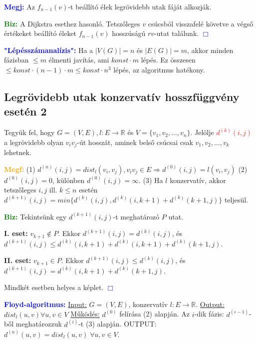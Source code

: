 \documentclass[../szamtud.tex]{subfiles}
\begin{document}
        \textcolor{blue}{\textbf{Megj:}} Az $f_{n-1}(v)$-t beállító élek legrövidebb utak fáját alkozják. 

        \textcolor{green}{\textbf{Biz:}} A Dijkstra esethez hasonló. Tetszőleges $v$ csúcsból visszafelé követve a végső értékeket beállító éleket $f_{n-1}(v)$ hosszúságú $rv$-utat találunk.  \textcolor{blue}{$\Box$} 

        \textcolor{blue}{\textbf{"Lépésszámanalízis":}} Ha a $|V(G)| = n$ és $|E(G)| = m$, akkor minden fázisban $\leq m$ élmenti javítás, ami $konst \cdot m$ lépés. Ez összesen $\leq konst \cdot (n-1) \cdot m \leq konst \cdot n^3$ lépés, az algoritmus hatékony.

    \subsection{Legrövidebb utak konzervatív hosszfüggvény esetén 2}

        Tegyük fel, hogy $G = (V,E), l:E \rightarrow \mathbb{R}$ és $V = \{v_1, v_2, \dots,v_n\}$. Jelölje \textcolor{red}{$d^{(k)}(i,j)$} a legrövidebb olyan $v_iv_j$-út hosszát, aminek belső csúcsai csak $v_1,v_2,\dots,v_k$ lehetnek.

        \textcolor{orange}{\textbf{Megf:}} (1) $d^{(n)}(i,j) = dist_l(v_i,v_j), v_iv_j \in E \Rightarrow d^{(0)}(i,j) = l(v_i,v_j)$ (2) $d^{(0)}(i,j) = 0$, különben $d^{(0)}(i,j) = \infty$. (3) Ha $l$ konzervatív, akkor tetszőleges $i,j$ ill. $k \leq n$ esetén $d^{(k+1)}(i,j) = min \{d^{(k)}(i,j), d^{(k)}(i,k+1)+d^{(k)}(k+1,j)\}$ teljesül.

        \textcolor{green}{\textbf{Biz:}} Tekintsünk egy $d^{(k+1)}(i,j)$-t meghatározó $P$ utat. 
        
        \textbf{I. eset:} $v_{k+1} \notin P$. Ekkor $d^{(k+1)}(i,j) = d^{(k)}(i,j)$, és $d^{(k+1)}(i,j) \leq d^{(k)}(i,k+1)+d^{(k)}(i,k+1)+d^{(k)}(k+1,j)$.

        \textbf{II. eset:} $v_{k+1} \in P$. Ekkor $d^{(k+1)}(i,j) \leq d^{(k)}(i,j)$, és $d^{(k+1)}(i,j) = d^{(k)}(i,k+1) + d^{(k)}(k+1,j)$.

        Mindkét esetben helyes a képlet.  \textcolor{blue}{$\Box$} 

        \textcolor{blue}{\textbf{Floyd-algoritmus:}} \underline{Input:} $G = (V,E)$, konzervatív $l:E \rightarrow \mathbb{R}$. \underline{Output:} $dist_l(u,v)\forall u,v \in V$ \underline{Működés:} $d^{(0)}$ felírása (2) alapján. Az $i$-dik fázis: $d^{(i-1)}$-ből meghatározzuk $d^{(i)}$-t (3) alapján. OUTPUT: $d^{(n)}(u,v) = dist_l(u,v)\; \forall u,v \in V$.
\end{document}
